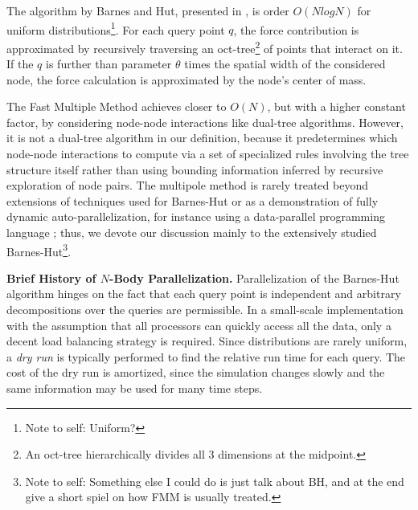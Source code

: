 \documentclass[times, leqno,twocolumn]{article}
\newcommand{\authornote}[1]{\footnote{Note to self: #1}}
\begin{document}
The algorithm by Barnes and Hut, presented in \cite{barneshut}, is order $O(N log N)$ for uniform distributions\authornote{Uniform?}.
For each query point $q$, the force contribution is approximated by recursively traversing an oct-tree\footnote{An oct-tree hierarchically divides all 3 dimensions at the midpoint.} of points that interact on it.
If the $q$ is further than parameter $\theta$ times the spatial width of the considered node, the force calculation is approximated by the node's center of mass.

The Fast Multiple Method \cite{greengard_fmm} achieves closer to $O(N)$, but with a higher constant factor, by considering node-node interactions like dual-tree algorithms.
However, it is not a dual-tree algorithm in our definition, because it predetermines which node-node interactions to compute via a set of specialized rules involving the tree structure itself rather than using bounding information inferred by recursive exploration of node pairs.
The multipole method is rarely treated beyond extensions of techniques used for Barnes-Hut \cite{singh95load} or as a demonstration of fully dynamic auto-parallelization, for instance using a data-parallel programming language \cite{nyland93dataparallel} \cite{washington_nesl}; thus, we devote our discussion mainly to the extensively studied Barnes-Hut\authornote{Something else I could do is just talk about BH, and at the end give a short spiel on how FMM is usually treated.}.


{\bf Brief History of $N$-Body Parallelization.}
Parallelization of the Barnes-Hut algorithm hinges on the fact that each query point is independent and arbitrary decompositions over the queries are permissible.
In a small-scale implementation with the assumption that all processors can quickly access all the data, only a decent load balancing strategy is required.
Since distributions are rarely uniform, a {\it dry run} is typically performed to find the relative run time for each query.
The cost of the dry run is amortized, since the simulation changes slowly and the same information may be used for many time steps.
\end{document}
